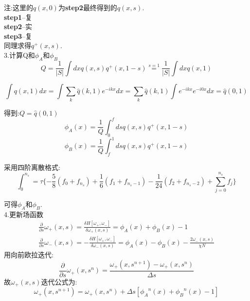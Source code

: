 \documentclass[12pt]{article}
\begin{document}
\begin{CJK}{UTF8}{gkai}
      注:这里的$q(x,0)$为\textbf{step2}最终得到的$q(x,s)$.\\
      
    \textbf{step1}--复\\
    
    \textbf{step2}--实\\
    
    \textbf{step3}--复\\
     
     同理求得$q^+(x,s)$.\\
     
     3.计算Q和$\phi_A$和$\phi_B$\\
     
      $$Q=\frac{1}{|S|}\int dx q(x,s)q^{+}(x,1-s)
      \overset{s=1}{=}\frac{1}{|S|}\int dx q(x,1)$$
      
      $$\int q(x,1) dx=\int\sum_{k}\hat{q}(k,1)e^{-ikx}dx=\sum_{k}\hat{q}(k,1)\int e^{-ikx}e^{-i0x}dx=\hat{q}(0,1)$$
      
      
     得到:$Q=\hat{q}(0,1)$\\
     
      $$\phi _A(x)=\frac{1}{Q}\int_0^f ds q(x,s)q^{+}(x,1-s)$$
      $$\phi _B(x)=\frac{1}{Q}\int_f^1 ds q(x,s)q^{+}(x,1-s)$$
      
      采用四阶离散格式:\\
      
      $$\int_{0}^{n_s}=\tau \{-\frac{5}{8}(f_0+f_{n_s})+\frac{1}{6}(f_1+f_{n_s-1})-\frac{1}{24}(f_2+f_{n_s-2})+\sum_{j=0}^{n_s}f_j\}$$
      
     可得$\phi_A$和$\phi_B$.\\
     
     4.更新场函数\\
     
     \begin{gather}    
     \frac{\partial}{\partial s}\omega_+(x,s)=\frac{\delta H[\omega_+,\omega_-]}{\delta \omega_+(x,s)}=\phi _A(x)+\phi _B(x)-1\\
     \frac{\partial}{\partial s}\omega_-(x,s)=-\frac{\delta H[\omega_+,\omega_-]}{\delta \omega_-(x,s)}=\phi _A(x)-\phi _B(x)-\frac{2\omega_-(x,s)}{\chi N} 
     \end{gather}
     用向前欧拉迭代:\\
     
     $$\frac{\partial}{\partial s}\omega_+(x,s^n)=\dfrac{\omega_+(x,s^{n+1})-\omega_+(x,s^{n})}{\Delta s}$$
     故$\omega_+(x,s)$迭代公式为:\\
     $$\omega_+(x,s^{n+1})=\omega_+(x,s^n)+\Delta s[{\phi _A}^n(x)+{\phi _B}^n(x)-1]$$
     

\end{CJK}
\end{document}
